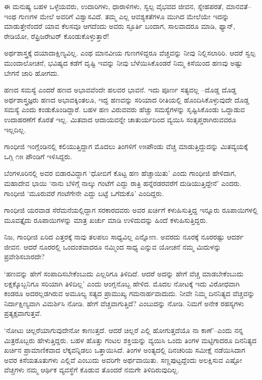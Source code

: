 ಈ ಮನುಷ್ಯ ಬಹಳ ಒಳ್ಳೆಯವರು, ಉದಾರಿಗಳು, ಧಾರಾಳಿಗಳು, ಸ್ವಲ್ಪ ವೈಭವದ ಜೀವನ, ಸ್ನೇಹಪರತೆ, ಮಾನವತೆ–ಇಂಥ ಗುಣಗಳ ಮೇಲೆ ಅವರಿಗೆ ವಿಶ್ವಾಸವಿದೆ. ತಮ್ಮ ಎಲ್ಲ ಆವಶ್ಯಕತೆಗಳೂ ಮುಗಿದ ಮೇಲೆಯೇ ಇದನ್ನು ಮಾಡುತ್ತೇನೆಂದರೆ ಯಾವ ಕೆಲಸವೂ ಆಗದೆಂದು ಅವರು ಸ್ಫೂರ್ತಿ ಬಂದಾಗ, ಸಾಲವಾದರೂ ಮಾಡಿ, ಫ್ಯಾನ್, ರೇಡಿಯೋ, ರೆಫ್ರಿಜರೇಟರ್ ಕೊಂಡು\-ಕೊಳ್ಳುತ್ತಾರೆ!

ಅರ್ಥಶಾಸ್ತ್ರಕ್ಕೆ ದಯಾದಾಕ್ಷಿಣ್ಯವಿಲ್ಲ. ಎಂಥ ಮಾನವೀಯ ಗುಣಗಳಿದ್ದರೂ ವೆಚ್ಚವನ್ನು ನೀವು ನಿಲ್ಲಿಸಲಾರಿರಿ. ಆದರೆ ಸ್ವಲ್ಪ ಮುಂದಾಲೋಚನೆ, ಭವಿಷ್ಯದ ಕಡೆಗೆ ದೃಷ್ಟಿ ಇವನ್ನು ನೀವು ಬೆಳೆಯಿಸಿಕೊಂಡರೆ ನಿಮ್ಮ ಕಿಸೆಯಿಂದ ಹಣವು ಅಷ್ಟು ಬೇಗನೆ ಜಾರಿ ಹೋಗದು.

ಹಣದ ಸಮಸ್ಯೆ ಎಂದರೆ ಹಣದ ಅಭಾವವೆಂದೇ ಹಲವರ ಭಾವನೆ. ಇದು ಪೂರ್ಣ ಸತ್ಯವಲ್ಲ –ದೊಡ್ಡ ದೊಡ್ಡ ಅರ್ಥಶಾಸ್ತ್ರಜ್ಞರು ಹಣದ ಅಭಾವಕ್ಕಿಂತಲೂ, ಇದ್ದ ಹಣವನ್ನು ಸರಿಯಾದ ರೀತಿಯಲ್ಲಿ ಹೊಂದಿಸಿಕೊಳ್ಳುವುದೇ ದೊಡ್ಡ ಸಮಸ್ಯೆ ಎಂದು ಕಂಡುಕೊಂಡಿದ್ದಾರೆ. ಬಹಳ ಹಣ ವಿರುವವರು ಹೆಚ್ಚು ಸಮಸ್ಯೆಗಳನ್ನು ಸೃಷ್ಟಿಸಿಕೊಂಡು ಒದ್ದಾಡುವ ಉದಾಹರಣೆಗೆ ಕೊರತೆ ಇಲ್ಲ. ಮಿತವಾದ ಆದಾಯವನ್ನೇ ಚಾತುರ್ಯದಿಂದ ವ್ಯಯಿಸಿ ಸಂತೃಪ್ತರಾಗಿರುವವರೂ ಇಲ್ಲದಿಲ್ಲ.

ಗಾಂಧೀಜಿ ಇಂಗ್ಲೆಂಡಿನಲ್ಲಿ ಕಲಿಯುತ್ತಿದ್ದಾಗ ಮೊದಲು ತಿಂಗಳಿಗೆ ೪೫ಪೌಂಡು ವೆಚ್ಚ ಮಾಡು\-ತ್ತಿದ್ದು\-ದನ್ನು ಮಿತವ್ಯಯಕ್ಕೆ ಒಗ್ಗಿ ೧೫ ಪೌಂಡಿಗೆ ಇಳಿಸಿದ್ದರು.

ಬೆಂಗಳೂರಿನಲ್ಲಿ ಅವರ ಬಿಡಾರವಿದ್ದಾಗ ‘ಧೋಬಿಗೆ ಕೊಟ್ಟ ಹಣ ಹೆಚ್ಚಾಯಿತು’ ಎಂದು ಗಾಂಧೀಜಿ ಹೇಳಿದಾಗ, ಮಹಾದೇವ ಭಾಯಿ ‘ನಾನು ಬೆಳಿಗ್ಗೆ ನಾಲ್ಕು ಗಂಟೆಗೆ ಎದ್ದು ರಾತ್ರಿ ಹನ್ನೆರಡರವರೆಗೆ ದುಡಿಯುತ್ತಿದ್ದೇನೆ’ ಎಂದರು. ಗಾಂಧೀಜಿ ‘ಮೂರುವರೆ ಗಂಟೆಗೇನೇ ಎದ್ದು ಬಟ್ಟೆ ಒಗೆದುಕೊ’ ಎಂದಿದ್ದರು.

ಗಾಂಧೀಜಿ ಯರವಾಡ ಸೆರೆಮನೆಯಲ್ಲಿದ್ದಾಗ ಸರಕಾರದವರು ಅವರ ಖರ್ಚಿಗೆ ಕಳುಹಿಸುತ್ತಿದ್ದ ಇನ್ನೂರು ರೂಪಾಯಿಗಳಲ್ಲಿ ಮೂವತ್ತೈದು ರೂಪಾಯಿಗಳನ್ನು ಮಾತ್ರ ಖರ್ಚು ಮಾಡಿ ಉಳಿದು\-ದನ್ನು ಹಿಂದೆ ಕಳುಹಿಸುತ್ತಿದ್ದರು.

ನಿಜ, ಗಾಂಧೀಜಿ ಏರಿದ ಎತ್ತರಕ್ಕೆ ನಾವು ತಲಪಲು ಸಾಧ್ಯವಿಲ್ಲ ಎನ್ನೋಣ. ಅವರದು ನೂರಕ್ಕೆ ನೂರರಷ್ಟು ಆದರ್ಶ ಜೀವನ. ಆದರೆ ನೂರರಲ್ಲಿ ಒಂದಂಶವಾದರೂ ನಮ್ಮಿಂದ ಸಾಧ್ಯ ಎನ್ನುವ ಯೋಚನೆ ನಮ್ಮ ಮಿದುಳನ್ನು ಪ್ರವೇಶಿಸಬಾರದೇ?

‘ಹಣವನ್ನು ಹೇಗೆ ಸಂಪಾದಿಸಬೇಕೆಂಬುದು ಎಲ್ಲರಿಗೂ ತಿಳಿದಿದೆ. ಆದರೆ ಅದನ್ನು ಹೇಗೆ ವೆಚ್ಚ ಮಾಡಬೇಕೆಂಬುದು ಲಕ್ಷಕ್ಕೊಬ್ಬನಿಗೂ ಸರಿಯಾಗಿ ತಿಳಿದಿಲ್ಲ’ ಎಂದು ಆಂಗ್ಲನೊಬ್ಬ ಹೇಳಿದ. ಮೊದಲ ನೋಟಕ್ಕೆ ಇದು ವಿರೋಧವಾಗಿ ಕಂಡರೂ ಅದರಲ್ಲಡಗಿರುವ ಅಮೂಲ್ಯ ಸತ್ಯದ ಪ್ರಾಮುಖ್ಯ ಗಮನಾರ್ಹವಾದುದು. ನೀವೇ ನಿಮ್ಮ ದಿನನಿತ್ಯದ ವೆಚ್ಚವನ್ನು ನಿರ್ದಾಕ್ಷಿಣ್ಯವಾಗಿ ವಿಮರ್ಶಿಸಿ ನೋಡಿ. ಹೇಗೆ ವೆಚ್ಚವಾಗುತ್ತಿದೆ? ಎಂಬುದನ್ನು ನೋಡಿ. ನಿಮಗೆ ಅನೇಕ ರಹಸ್ಯಗಳು ಪ್ರತ್ಯಕ್ಷವಾಗುತ್ತವೆ.

‘ನೋಟು ಚಿಲ್ಲರೆಯಾಗುವುದೇನೋ ಕಾಣುತ್ತದೆ. ಆದರೆ ಚಿಲ್ಲರೆ ಎಲ್ಲಿ ಹೋಗುತ್ತದೆಯೊ ನಾ ಕಾಣೆ’–ಎಂದು ನನ್ನ ಮಿತ್ರರೊಬ್ಬರು ಹೇಳುತ್ತಿದ್ದರು. ಬಹಳ ಹೊತ್ತು ಗಂಟಲ ಶಕ್ತಿಯನ್ನು ವ್ಯಯಿಸಿ ಒಂದು ತಿಂಗಳ ಮಟ್ಟಿಗಾದರೂ ದಿನನಿತ್ಯದ ಖರ್ಚಿನ ಪ್ರಾಮಾಣಿಕವಾದ ಲೆಕ್ಕವನ್ನಿಡಲು ಒತ್ತಾಯಿಸಿದೆ. ತಿಂಗಳ ಅಂತ್ಯದಲ್ಲಿ ದಿನಚರಿಯ ಸಮೀಕ್ಷೆ ನಡೆಯಿಸಿದಾಗ ಅವರ ಕಿಸೆಯ\break ತೂತುಗಳು ಎಲ್ಲಿವೆ ಎಂಬುದು ಅವರಿಗೇ ಅರ್ಥವಾಯಿತು. ಸಣ್ಣಪುಟ್ಟದ್ದೆಂದು ಅಲಕ್ಷಿಸುವ ಎಷ್ಟೋ ವೆಚ್ಚಗಳು ನಮ್ಮ ಆರ್ಥಿಕ ವ್ಯವಸ್ಥೆಗೆ ಕೊಡುವ ತೊಂದರೆ ನಮಗೇ ತಿಳಿದಿರುವುದಿಲ್ಲ.

